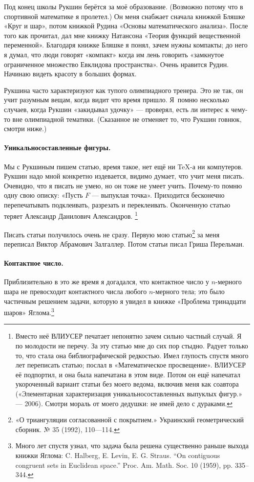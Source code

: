 \documentclass{book}
\begin{document}
Под конец школы Рукшин берётся за моё образование.
(Возможно потому что в спортивной математике я пролетел.)
Он меня снабжает сначала книжкой Бляшке «Круг и шар»,
потом
книжкой Рудина «Основы математического анализа».
После того как прочитал, дал мне книжку Натансона «Теория функций вещественной переменной».
Благодаря книжке Бляшке я понял, зачем нужны компакты;
до него я думал, что люди говорят «компакт» когда им лень говорить «замкнутое ограниченное множество Евклидова пространства».
Очень нравится Рудин.
Начинаю видеть красоту в больших формах.

Рукшина часто характеризуют как тупого олимпиадного тренера.
Это не так, он учит разумным вещам, когда видит что время пришло.
Я~помню несколько случаев, когда Рукшин «закидывал удочку» ---
проверял, есть ли интерес к чему-то вне олимпиадной тематики.
(Сказанное не отменяет то, что Рукшин говнюк, смотри ниже.)

\paragraph{Уникальносоставленные фигуры.}
Мы с Рукшиным пишем статью,
время такое, нет ещё ни TeX-а ни компутеров.
Рукшин надо мной конкретно издевается,
видимо думает, что учит меня писать.
Очевидно, что я писать не умею, но он тоже не умеет учить.
Почему-то помню одну свою описку: «Пусть $F$ --- выпуклая точка».
Приходится бесконечно перепечатывать подклеивать, разрезать и переклеивать.
Оконченную статью теряет Александр Данилович Александров.%
\footnote{Вместо неё ВЛИУСЕР печатает непонятно зачем сильно частный случай.
Я по молодости не перечу.
За эту статью мне до сих пор стыдно. 
Радует только то, что стала она библиографической редкостью.
Имел глупость спустя много лет переписать статью; послал в «Математическое просвещение».
ВЛИУСЕР её подпортил, и она была напечатана в этом виде.
Потом он ещё напечатал укороченный вариант статьи без моего ведома, включив меня как соавтора («Элементарная характеризация уникальносоставленных выпуклых фигур.» --- 2006).
Смотри мораль от моего дедушки: не имей дело с дураками.}

Писать статьи получилось очень не сразу.
Первую мою статью\footnote{«О триангуляции согласованной с покрытием.» Украинский геометрический сборник.
№ 35 (1992), 110---114.} за меня переписал Виктор Абрамович Залгаллер.
Потом статьи писал Гриша Перельман.

\paragraph{Контактное число.}
Приблизительно в это же время я догадался, что контактное число у $n$-мерного шара не превосходит контактного числа любого $n$-мерного тела;
это было частичным решением задачи, которую я увидел в книжке «Проблема тринадцати шаров» Яглома.\footnote{Много лет спустя узнал, что задача была решена существенно раньше выхода книжки Яглома: C.
Halberg, E.
Levin, E.
G.
Straus.
“On contiguous congruent sets in Euclidean space.” Proc.
Am.
Math.
Soc.
10 (1959), pp.
335--344.}
\end{document}
